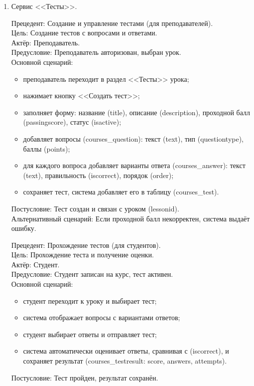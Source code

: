 \begin{enumerate}
	\item {Сервис <<Тесты>>}.
	
	{Прецедент: Создание и управление тестами (для преподавателей)}. \\
	{Цель}: Создание тестов с вопросами и ответами. \\
	{Актёр}: Преподаватель. \\
	{Предусловие}: Преподаватель авторизован, выбран урок. \\
	{Основной сценарий}:
	\begin{itemize}
		\item преподаватель переходит в раздел <<Тесты>> урока;
		\item нажимает кнопку <<Создать тест>>;
		\item заполняет форму: название (title), описание (description), проходной балл (passingscore), статус (isactive);
		\item добавляет вопросы (courses\_question): текст (text), тип (questiontype), баллы (points);
		\item для каждого вопроса добавляет варианты ответа (courses\_answer): текст (text), правильность (iscorrect), порядок (order);
		\item сохраняет тест, система добавляет его в таблицу (courses\_test).
	\end{itemize}
	{Постусловие}: Тест создан и связан с уроком (lessonid). \\
	{Альтернативный сценарий}: Если проходной балл некорректен, система выдаёт ошибку.
	
	{Прецедент: Прохождение тестов (для студентов)}. \\
	{Цель}: Прохождение теста и получение оценки. \\
	{Актёр}: Студент. \\
	{Предусловие}: Студент записан на курс, тест активен. \\
	{Основной сценарий}:
	\begin{itemize}
		\item студент переходит к уроку и выбирает тест;
		\item система отображает вопросы с вариантами ответов;
		\item студент выбирает ответы и отправляет тест;
		\item система автоматически оценивает ответы, сравнивая с (iscorrect), и сохраняет результат (courses\_testresult: score, answers, attempts).
	\end{itemize}
	{Постусловие}: Тест пройден, результат сохранён.
	

\end{enumerate}
